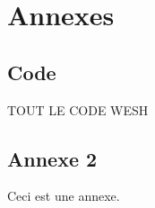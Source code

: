 \appendix
\chapter*{Annexes}
\renewcommand{\thesection}{\Alph{section}}

\section{Code}
\label{appendix:1}

TOUT LE CODE WESH

\newpage
\section{Annexe 2}
\label{appendix:2}
Ceci est une annexe.
